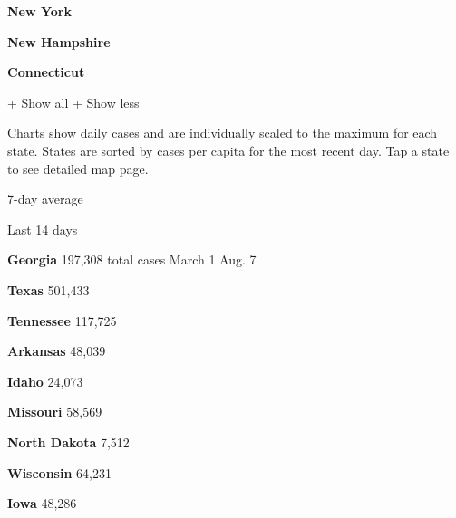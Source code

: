 \textbf{New York}

\href{https://www.nytimes.com/interactive/2020/us/new-hampshire-coronavirus-cases.html}{}

\textbf{New Hampshire}

\href{https://www.nytimes.com/interactive/2020/us/connecticut-coronavirus-cases.html}{}

\textbf{Connecticut}

+ Show all + Show less

Charts show daily cases and are individually scaled to the maximum for
each state. States are sorted by cases per capita for the most recent
day. Tap a state to see detailed map page.

\href{https://www.nytimes.com/interactive/2020/us/georgia-coronavirus-cases.html}{}

7-day average

Last 14 days

\textbf{Georgia} 197,308 total cases March 1 Aug. 7

\href{https://www.nytimes.com/interactive/2020/us/texas-coronavirus-cases.html}{}

\textbf{Texas} 501,433

\href{https://www.nytimes.com/interactive/2020/us/tennessee-coronavirus-cases.html}{}

\textbf{Tennessee} 117,725

\href{https://www.nytimes.com/interactive/2020/us/arkansas-coronavirus-cases.html}{}

\textbf{Arkansas} 48,039

\href{https://www.nytimes.com/interactive/2020/us/idaho-coronavirus-cases.html}{}

\textbf{Idaho} 24,073

\href{https://www.nytimes.com/interactive/2020/us/missouri-coronavirus-cases.html}{}

\textbf{Missouri} 58,569

\href{https://www.nytimes.com/interactive/2020/us/north-dakota-coronavirus-cases.html}{}

\textbf{North Dakota} 7,512

\href{https://www.nytimes.com/interactive/2020/us/wisconsin-coronavirus-cases.html}{}

\textbf{Wisconsin} 64,231

\href{https://www.nytimes.com/interactive/2020/us/iowa-coronavirus-cases.html}{}

\textbf{Iowa} 48,286

\href{https://www.nytimes.com/interactive/2020/us/nebraska-coronavirus-cases.html}{}

